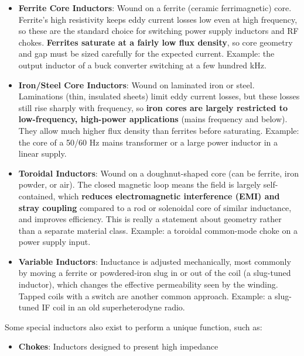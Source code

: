 \begin{itemize}
\begin{itemize}
        and RF applications where core losses would otherwise dominate.
        Example: an air-core coil in a VHF/UHF matching network.
      \item \textbf{Ferrite Core Inductors}: Wound on a ferrite (ceramic
        ferrimagnetic) core. Ferrite's high resistivity keeps eddy current
        losses low even at high frequency, so these are the standard choice
        for switching power supply inductors and RF chokes. \textbf{Ferrites
        saturate at a fairly low flux density}, so core geometry and gap
        must be sized carefully for the expected current.
        Example: the output inductor of a buck converter switching at a few
        hundred kHz.
      \item \textbf{Iron/Steel Core Inductors}: Wound on laminated iron or
        steel. Laminations (thin, insulated sheets) limit eddy current
        losses, but these losses still rise sharply with frequency, so
        \textbf{iron cores are largely restricted to low-frequency, high-power
        applications} (mains frequency and below). They allow much higher
        flux density than ferrites before saturating.
        Example: the core of a 50/60 Hz mains transformer or a large power
        inductor in a linear supply.
      \item \textbf{Toroidal Inductors}: Wound on a doughnut-shaped core
        (can be ferrite, iron powder, or air). The closed magnetic loop
        means the field is largely self-contained, which \textbf{reduces
        electromagnetic interference (EMI) and stray coupling} compared to
        a rod or solenoidal core of similar inductance, and improves
        efficiency. This is really a statement about geometry rather than
        a separate material class.
        Example: a toroidal common-mode choke on a power supply input.
      \item \textbf{Variable Inductors}: Inductance is adjusted mechanically,
        most commonly by moving a ferrite or powdered-iron slug in or out of
        the coil (a slug-tuned inductor), which changes the effective
        permeability seen by the winding. Tapped coils with a switch are
        another common approach.
        Example: a slug-tuned IF coil in an old superheterodyne radio.
    \end{itemize}
    Some special inductors also exist to perform a unique function, such as:
    \begin{itemize}
      \item \textbf{Chokes}: Inductors designed to present high impedance

\end{itemize}
\end{itemize}
